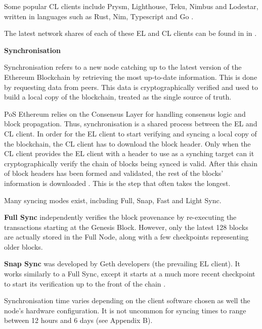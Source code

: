 Some popular CL clients include Prysm, Lighthouse, Teku, Nimbus and Lodestar, written in languages such as Rust, Nim, Typescript and Go \cite{EthereumEthereum.org}. 

The latest network shares of each of these EL and CL clients can be found in  in .

\textbf{Synchronisation} 
\label{SyncLitRev}

Synchronisation refers to a new node catching up to the latest version of the Ethereum Blockchain by retrieving the most up-to-date information. This is done by requesting data from peers. This data is cryptographically verified and used to build a local copy of the blockchain, treated as the single source of truth.

PoS Ethereum relies on the Consensus Layer for handling consensus logic and block propagation. Thus, synchronisation is a shared process between the EL and CL client. In order for the EL client to start verifying and syncing a local copy of the blockchain, the CL client has to download the block header. Only when the CL client provides the EL client with a header to use as a synching target can it cryptographically verify the chain of blocks being synced is valid. After this chain of block headers has been formed and validated, the rest of the blocks' information is downloaded \cite{2022DeveloperGo-ethereum}. This is the step that often takes the longest.

Many syncing modes exist, including Full, Snap, Fast and Light Sync.

\textbf{Full Sync }independently verifies the block provenance by re-executing the transactions starting at the Genesis Block. However, only the latest 128 blocks are actually stored in the Full Node, along with a few checkpoints representing older blocks. 

\textbf{Snap Sync }was developed by Geth developers (the prevailing EL client). It works similarly to a Full Sync, except it starts at a much more recent checkpoint to start its verification up to the front of the chain \cite{2022DeveloperGo-ethereum}.

Synchronisation time varies depending on the client software chosen as well the node's hardware configuration. It is not uncommon for syncing times to range between 12 hours and 6 days (see Appendix B).


